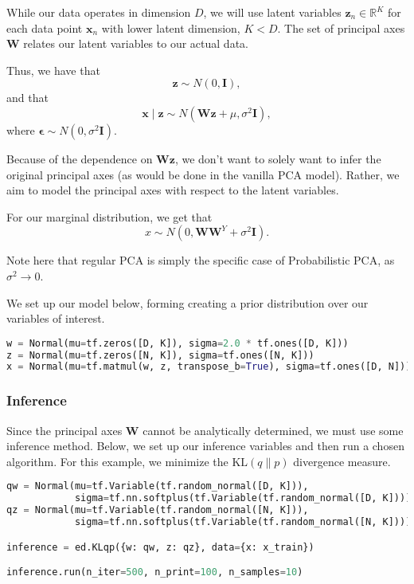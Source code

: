 While our data operates in dimension $D$, we will use latent variables
$\mathbf{z}_n \in \mathbb{R}^K$ for each data point $\mathbf{x}_n$
with lower latent dimension, $K < D$. The set of principal axes
$\mathbf{W}$ relates our latent variables to our actual data.

Thus, we have that
\begin{equation*}
\mathbf{z} \sim N(0, \mathbf{I}),
\end{equation*}
and that
\begin{equation*}
\mathbf{x} \mid \mathbf{z} \sim N(\mathbf{Wz} + \mu, \sigma^2\mathbf{I}),
\end{equation*}
where $\mathbf{\epsilon} \sim N(0, \sigma^2\mathbf{I})$.

Because of the dependence on $\mathbf{Wz}$, we don't want to solely
want to infer the original principal axes (as would be done in the
vanilla PCA model). Rather, we aim to model the principal axes with
respect to the latent variables.

For our marginal distribution, we get that
\begin{equation*}
x \sim N(0, \mathbf{W}\mathbf{W}^Y + \sigma^2\mathbf{I}).
\end{equation*}

Note here that regular PCA is simply the specific case of
Probabilistic PCA, as $\sigma^2 \to 0$.

We set up our model below, forming creating a prior distribution over
our variables of interest.

\begin{lstlisting}[language=Python]
w = Normal(mu=tf.zeros([D, K]), sigma=2.0 * tf.ones([D, K]))
z = Normal(mu=tf.zeros([N, K]), sigma=tf.ones([N, K]))
x = Normal(mu=tf.matmul(w, z, transpose_b=True), sigma=tf.ones([D, N]))

\end{lstlisting}

\subsubsection{Inference}

Since the principal axes $\mathbf{W}$ cannot be analytically
determined, we must use some inference method. Below, we set up our
inference variables and then run a chosen algorithm. For this
example, we minimize the $\text{KL}(q\|p)$ divergence measure.

\begin{lstlisting}[language=Python]
qw = Normal(mu=tf.Variable(tf.random_normal([D, K])),
            sigma=tf.nn.softplus(tf.Variable(tf.random_normal([D, K]))))
qz = Normal(mu=tf.Variable(tf.random_normal([N, K])),
            sigma=tf.nn.softplus(tf.Variable(tf.random_normal([N, K]))))

inference = ed.KLqp({w: qw, z: qz}, data={x: x_train})

inference.run(n_iter=500, n_print=100, n_samples=10)
\end{lstlisting}

